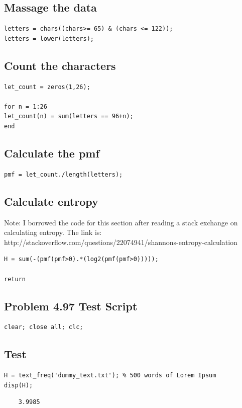 \documentclass[12pt]{article}
\begin{document}
\subsection*{Massage the data}

\begin{verbatim}
letters = chars((chars>= 65) & (chars <= 122));
letters = lower(letters);
\end{verbatim}

\subsection*{Count the characters}

\begin{verbatim}
let_count = zeros(1,26);

for n = 1:26
let_count(n) = sum(letters == 96+n);
end
\end{verbatim}

\subsection*{Calculate the pmf}

\begin{verbatim}
pmf = let_count./length(letters);
\end{verbatim}

\subsection*{Calculate entropy}
Note: I borrowed the code for this section after reading a stack exchange on calculating entropy. The link is: \\
http://stackoverflow.com/questions/22074941/shannons-entropy-calculation

\begin{verbatim}
H = sum(-(pmf(pmf>0).*(log2(pmf(pmf>0)))));

return
\end{verbatim}
\subsection*{Problem 4.97 Test Script}

\begin{verbatim}
clear; close all; clc;
\end{verbatim}


\subsection*{Test}

\begin{verbatim}
H = text_freq('dummy_text.txt'); % 500 words of Lorem Ipsum
disp(H);
\end{verbatim}

        \color{lightgray} \begin{verbatim}    3.9985

\end{verbatim} \color{black}
\end{document}
